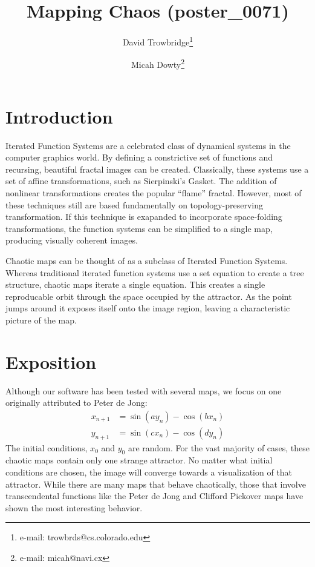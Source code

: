 \documentclass{acmsiggraph}
\title{Mapping Chaos (poster\_0071)}
\author{
  David Trowbridge\thanks{e-mail: trowbrds@cs.colorado.edu}
\and
  Micah Dowty\thanks{e-mail: micah@navi.cx}
}
\begin{document}
\maketitle

\section{Introduction}
\copyrightspace
Iterated Function Systems are a celebrated class of dynamical systems in the
computer graphics world. By defining a constrictive set of functions and
recursing, beautiful fractal images can be created. Classically, these
systems use a set of affine transformations, such as Sierpinski's Gasket.
The addition of nonlinear transformations creates the popular ``flame''
fractal. However, most of these techniques still are based fundamentally
on topology-preserving transformation. If this technique is exapanded to
incorporate space-folding transformations, the function systems can be
simplified to a single map, producing visually coherent images.

Chaotic maps can be thought of as a subclass of Iterated Function Systems.
Whereas traditional iterated function systems use a set equation to create
a tree structure, chaotic maps iterate a single equation. This creates a
single reproducable orbit through the space occupied by the attractor. As
the point jumps around it exposes itself onto the image region, leaving
a characteristic picture of the map.

\section{Exposition}
Although our software has been tested with several maps, we focus on one
originally attributed to Peter de Jong:
\begin{eqnarray*}
  x_{n+1} &= \sin (a y_n) - \cos (b x_n) \\
  y_{n+1} &= \sin (c x_n) - \cos (d y_n)
\end{eqnarray*}
The initial conditions, $x_0$ and $y_0$ are random. For the vast majority
of cases, these chaotic maps contain only one strange attractor. No matter
what initial conditions are chosen, the image will converge towards a
visualization of that attractor. While there are many maps that behave
chaotically, those that involve transcendental functions like the Peter
de Jong and Clifford Pickover maps have shown the most interesting behavior.
\end{document}
